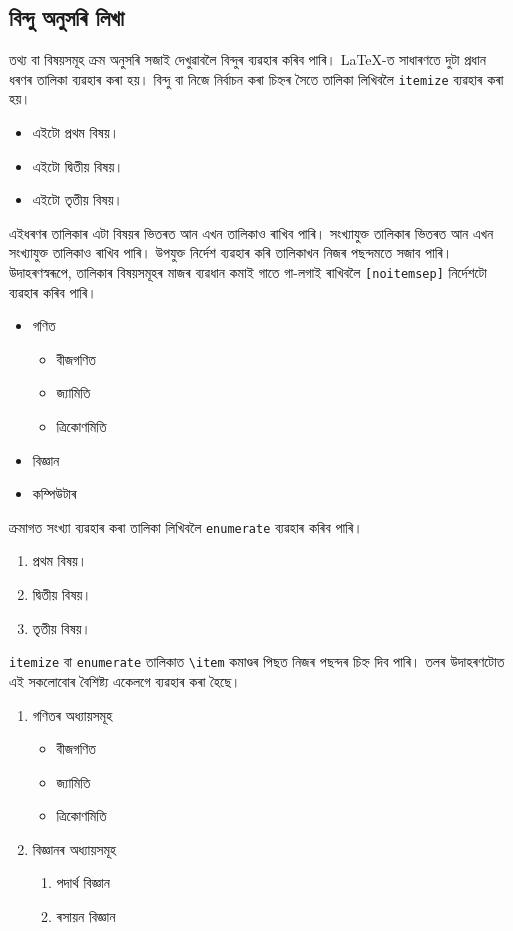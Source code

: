 \documentclass[12pt,a4paper]{article} %
\begin{document}
	\subsection{বিন্দু অনুসৰি লিখা}
	
	তথ্য বা বিষয়সমূহ ক্ৰম অনুসৰি সজাই দেখুৱাবলৈ বিন্দুৰ ব্যৱহাৰ কৰিব পাৰি। \LaTeX{}-ত সাধাৰণতে দুটা প্ৰধান ধৰণৰ তালিকা ব্যৱহাৰ কৰা হয়। বিন্দু বা নিজে নিৰ্বাচন কৰা চিহ্নৰ সৈতে তালিকা লিখিবলৈ \texttt{itemize} ব্যৱহাৰ কৰা হয়। 
	\begin{itemize}
		\item এইটো প্ৰথম বিষয়।
		\item এইটো দ্বিতীয় বিষয়।
		\item এইটো তৃতীয় বিষয়।
	\end{itemize}
	এইধৰণৰ তালিকাৰ এটা বিষয়ৰ ভিতৰত আন এখন তালিকাও ৰাখিব পাৰি। সংখ্যাযুক্ত তালিকাৰ ভিতৰত আন এখন সংখ্যাযুক্ত তালিকাও ৰাখিব পাৰি। উপযুক্ত নিৰ্দেশ ব্যৱহাৰ কৰি তালিকাখন নিজৰ পছন্দমতে সজাব পাৰি। উদাহৰণস্বৰূপে, তালিকাৰ বিষয়সমূহৰ মাজৰ ব্যৱধান কমাই গাতে গা-লগাই ৰাখিবলৈ \texttt{[noitemsep]} নিৰ্দেশটো ব্যৱহাৰ কৰিব পাৰি।
	\begin{itemize}[noitemsep]
		\item গণিত
		\begin{itemize}[noitemsep]
			\item বীজগণিত
			\item জ্যামিতি
			\item ত্ৰিকোণমিতি
		\end{itemize}
		\item বিজ্ঞান
		\item কম্পিউটাৰ
	\end{itemize}
	ক্ৰমাগত সংখ্যা ব্যৱহাৰ কৰা তালিকা লিখিবলৈ \texttt{enumerate} ব্যৱহাৰ কৰিব পাৰি।
	\begin{enumerate}[noitemsep]
		\item প্ৰথম বিষয়।
		\item দ্বিতীয় বিষয়।
		\item তৃতীয় বিষয়।
	\end{enumerate}
	\texttt{itemize} বা \texttt{enumerate} তালিকাত \texttt{\textbackslash item} কমাণ্ডৰ পিছত নিজৰ পছন্দৰ চিহ্ন দিব পাৰি। তলৰ উদাহৰণটোত এই সকলোবোৰ বৈশিষ্ট্য একেলগে ব্যৱহাৰ কৰা হৈছে।
	\begin{enumerate}[noitemsep]
		\item[$\diamond$] গণিতৰ অধ্যায়সমূহ
		\begin{itemize}[noitemsep]
			\item[(ক)] বীজগণিত
			\item[(খ)] জ্যামিতি
			\item[(গ)] ত্ৰিকোণমিতি
		\end{itemize}
		\item[$\diamond$] বিজ্ঞানৰ অধ্যায়সমূহ
		\begin{enumerate}[noitemsep]
			\item পদাৰ্থ বিজ্ঞান
			\item ৰসায়ন বিজ্ঞান
		\end{enumerate}
	\end{enumerate}
	
\end{document}
